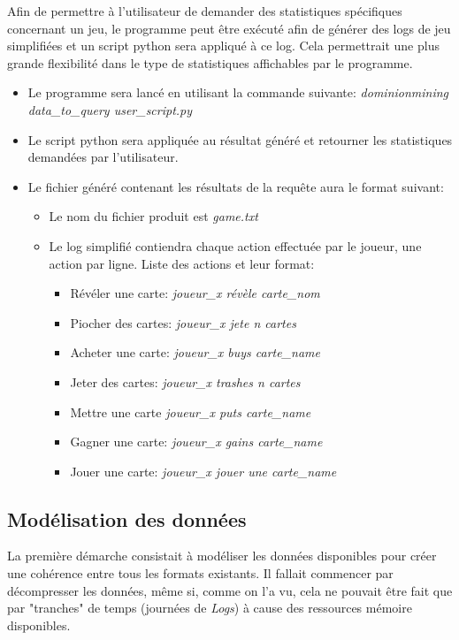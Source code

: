 Afin de permettre à l'utilisateur de demander des statistiques spécifiques concernant un jeu, le programme peut être exécuté afin de générer des logs de jeu simplifiées et un script python sera appliqué à ce log. Cela permettrait une plus grande flexibilité dans le type de statistiques affichables par le programme.
\begin{itemize}
\item Le programme sera lancé en utilisant la commande suivante: \textit{dominionmining data\_to\_query user\_script.py}
 \item Le script python sera appliquée au résultat généré et retourner les statistiques demandées par l'utilisateur.
\item Le fichier généré contenant les résultats de la requête aura le format suivant:
\begin{itemize}
\item Le nom du fichier produit est \textit{game.txt}
\item Le log simplifié contiendra chaque action effectuée par le joueur, une action par ligne. Liste des actions et leur format:
\begin{itemize}
\item Révéler une carte: \textit{joueur\_x révèle carte\_nom}
\item Piocher des cartes: \textit{joueur\_x jete n cartes}
\item Acheter une carte: \textit{joueur\_x buys carte\_name}
\item Jeter des cartes: \textit{joueur\_x trashes n cartes}
\item Mettre une carte \textit{joueur\_x puts carte\_name}
\item Gagner une carte: \textit{joueur\_x gains carte\_name}
\item Jouer une carte: \textit{joueur\_x jouer une carte\_name}

\end{itemize}
\end{itemize}
\end{itemize}
\fi
\subsection{Modélisation des données}
La première démarche consistait à modéliser les données disponibles pour créer une cohérence entre tous les formats existants. Il fallait commencer par décompresser les données, même si, comme on l'a vu, cela ne pouvait être fait que par "tranches" de temps (journées de \textit{Logs}) à cause des ressources mémoire disponibles. 

